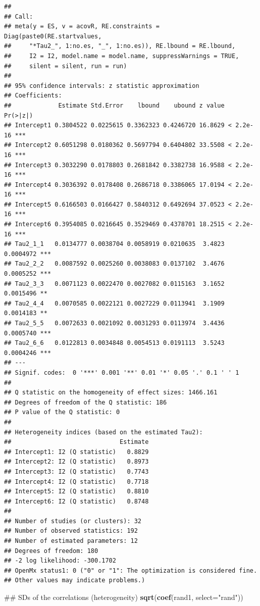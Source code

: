 \documentclass[]{article}
\newenvironment{Shaded}{\begin{snugshade}}{\end{snugshade}}
\newcommand{\KeywordTok}[1]{\textcolor[rgb]{0.13,0.29,0.53}{\textbf{#1}}}
\newcommand{\DataTypeTok}[1]{\textcolor[rgb]{0.13,0.29,0.53}{#1}}
\newcommand{\StringTok}[1]{\textcolor[rgb]{0.31,0.60,0.02}{#1}}
\newcommand{\NormalTok}[1]{#1}
\begin{document}
\begin{verbatim}
## 
## Call:
## meta(y = ES, v = acovR, RE.constraints = Diag(paste0(RE.startvalues, 
##     "*Tau2_", 1:no.es, "_", 1:no.es)), RE.lbound = RE.lbound, 
##     I2 = I2, model.name = model.name, suppressWarnings = TRUE, 
##     silent = silent, run = run)
## 
## 95% confidence intervals: z statistic approximation
## Coefficients:
##             Estimate Std.Error    lbound    ubound z value  Pr(>|z|)    
## Intercept1 0.3804522 0.0225615 0.3362323 0.4246720 16.8629 < 2.2e-16 ***
## Intercept2 0.6051298 0.0180362 0.5697794 0.6404802 33.5508 < 2.2e-16 ***
## Intercept3 0.3032290 0.0178803 0.2681842 0.3382738 16.9588 < 2.2e-16 ***
## Intercept4 0.3036392 0.0178408 0.2686718 0.3386065 17.0194 < 2.2e-16 ***
## Intercept5 0.6166503 0.0166427 0.5840312 0.6492694 37.0523 < 2.2e-16 ***
## Intercept6 0.3954085 0.0216645 0.3529469 0.4378701 18.2515 < 2.2e-16 ***
## Tau2_1_1   0.0134777 0.0038704 0.0058919 0.0210635  3.4823 0.0004972 ***
## Tau2_2_2   0.0087592 0.0025260 0.0038083 0.0137102  3.4676 0.0005252 ***
## Tau2_3_3   0.0071123 0.0022470 0.0027082 0.0115163  3.1652 0.0015496 ** 
## Tau2_4_4   0.0070585 0.0022121 0.0027229 0.0113941  3.1909 0.0014183 ** 
## Tau2_5_5   0.0072633 0.0021092 0.0031293 0.0113974  3.4436 0.0005740 ***
## Tau2_6_6   0.0122813 0.0034848 0.0054513 0.0191113  3.5243 0.0004246 ***
## ---
## Signif. codes:  0 '***' 0.001 '**' 0.01 '*' 0.05 '.' 0.1 ' ' 1
## 
## Q statistic on the homogeneity of effect sizes: 1466.161
## Degrees of freedom of the Q statistic: 186
## P value of the Q statistic: 0
## 
## Heterogeneity indices (based on the estimated Tau2):
##                              Estimate
## Intercept1: I2 (Q statistic)   0.8829
## Intercept2: I2 (Q statistic)   0.8973
## Intercept3: I2 (Q statistic)   0.7743
## Intercept4: I2 (Q statistic)   0.7718
## Intercept5: I2 (Q statistic)   0.8810
## Intercept6: I2 (Q statistic)   0.8748
## 
## Number of studies (or clusters): 32
## Number of observed statistics: 192
## Number of estimated parameters: 12
## Degrees of freedom: 180
## -2 log likelihood: -300.1702 
## OpenMx status1: 0 ("0" or "1": The optimization is considered fine.
## Other values may indicate problems.)
\end{verbatim}

\begin{Shaded}
\begin{Highlighting}[]
\NormalTok{## SDs of the correlations (heterogeneity)}
\KeywordTok{sqrt}\NormalTok{(}\KeywordTok{coef}\NormalTok{(rand1, }\DataTypeTok{select=}\StringTok{"rand"}\NormalTok{))}
\end{Highlighting}
\end{Shaded}
\end{document}
